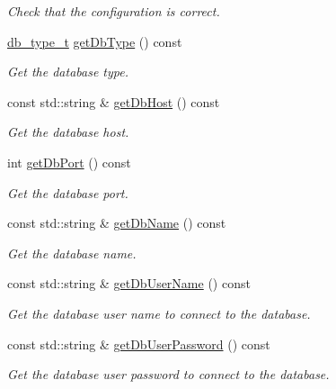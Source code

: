 \begin{DoxyCompactItemize}
\begin{DoxyCompactList}\small\item\em Check that the configuration is correct. \item\end{DoxyCompactList}\item 
\hyperlink{classDbConfiguration_a4a57e43a5017a5c4833a784a994c91cf}{db\_\-type\_\-t} \hyperlink{classDbConfiguration_aa3f2342a112f6fbe49c55dcdf1c0ba06}{getDbType} () const 
\begin{DoxyCompactList}\small\item\em Get the database type. \item\end{DoxyCompactList}\item 
const std::string \& \hyperlink{classDbConfiguration_a1a086da9c68fc4f7486aeb6cdccf190c}{getDbHost} () const 
\begin{DoxyCompactList}\small\item\em Get the database host. \item\end{DoxyCompactList}\item 
int \hyperlink{classDbConfiguration_a990bf4ff748852ddf6c3855947222088}{getDbPort} () const 
\begin{DoxyCompactList}\small\item\em Get the database port. \item\end{DoxyCompactList}\item 
const std::string \& \hyperlink{classDbConfiguration_a3baca98b7587f48e9ce0fe3692ccfee3}{getDbName} () const 
\begin{DoxyCompactList}\small\item\em Get the database name. \item\end{DoxyCompactList}\item 
const std::string \& \hyperlink{classDbConfiguration_ad7574a825957ea574d97310d0e32f642}{getDbUserName} () const 
\begin{DoxyCompactList}\small\item\em Get the database user name to connect to the database. \item\end{DoxyCompactList}\item 
const std::string \& \hyperlink{classDbConfiguration_a24814f0a123ed8afdfc8f0883033bc80}{getDbUserPassword} () const 
\begin{DoxyCompactList}\small\item\em Get the database user password to connect to the database. \item\end{DoxyCompactList}\item 

\end{DoxyCompactItemize}

